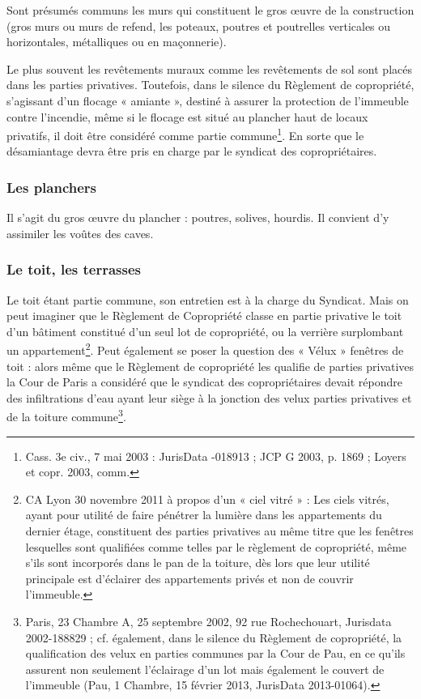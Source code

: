 		Sont présumés communs les murs qui constituent le gros œuvre de la construction (gros murs ou murs de
		refend, les poteaux, poutres et poutrelles verticales ou horizontales, métalliques ou en maçonnerie).
		
		Le plus souvent les revêtements muraux comme les revêtements de sol sont placés dans les parties
		privatives. Toutefois, dans le silence du Règlement de copropriété, s’agissant d’un flocage « amiante »,
		destiné à assurer la protection de l’immeuble contre l’incendie, même si le flocage est situé au plancher
		haut de locaux privatifs, il doit être considéré comme partie commune\footnote{Cass. 3e civ., 7 mai 2003 : JurisData -018913 ; JCP G 2003, p. 1869 ; Loyers et copr. 2003, comm.}. En sorte que le désamiantage
		devra être pris en charge par le syndicat des copropriétaires.
		
		\subsubsection{Les planchers}
		
		Il s’agit du gros œuvre du plancher : poutres, solives, hourdis. Il convient d'y assimiler les voûtes des caves.
		
		\subsubsection{Le toit, les terrasses}
		
		Le toit étant partie commune, son entretien est à la charge du Syndicat. Mais on peut imaginer que le
		Règlement de Copropriété classe en partie privative le toit d'un bâtiment constitué d'un seul lot de
		copropriété, ou la verrière surplombant un appartement\footnote{CA Lyon 30 novembre 2011 à propos d’un « ciel vitré » : Les ciels vitrés, ayant pour utilité de faire pénétrer la lumière dans les appartements du dernier étage, constituent des parties privatives au même titre que les fenêtres lesquelles sont qualifiées comme telles par le règlement de copropriété, même s'ils sont incorporés dans le pan de la toiture, dès lors que leur utilité principale est d'éclairer des appartements privés et non de couvrir l'immeuble.}. Peut également se poser la question des
		« Vélux » fenêtres de toit : alors même que le Règlement de copropriété les qualifie de parties privatives
		la Cour de Paris a considéré que le syndicat des copropriétaires devait répondre des infiltrations d’eau
		ayant leur siège à la jonction des velux parties privatives et de la toiture commune\footnote{Paris, 23\degre{} Chambre A, 25 septembre 2002, 92 rue Rochechouart, Jurisdata 2002-188829 ; cf. également, dans le silence du Règlement de copropriété, la qualification des velux en parties communes par la Cour de Pau, en ce qu’ils assurent non seulement l’éclairage d’un lot mais également le couvert de l’immeuble (Pau, 1\degre{} Chambre, 15 février 2013, JurisData 2013-01064).}.
		
